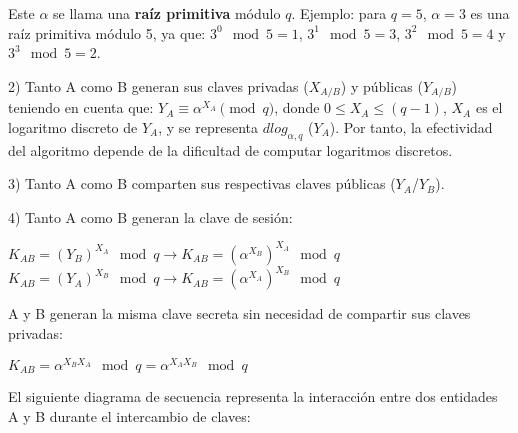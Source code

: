 \documentclass[11pt]{article}
\begin{document}
Este $\alpha$ se llama una \textbf{raíz primitiva} módulo $q$. Ejemplo: para $q = 5$, $\alpha = 3$ es una raíz primitiva módulo 5, ya que:
$3^0 \mod 5 = 1$, $3^1 \mod 5 = 3$, $3^2 \mod 5 = 4$ y $3^3 \mod 5 = 2$.

2) Tanto A como B generan sus claves privadas ($X_{A/B}$) y públicas ($Y_{A/B}$) teniendo en cuenta que:  $ Y_{A} \equiv \alpha^{X_A} \pmod{q}$, donde $0 \le X_A \le (q-1)$, $X_A$ es el logaritmo discreto de $Y_A$, y se representa $dlog_{\alpha,q}$ ($Y_A$). Por tanto, la efectividad del algoritmo depende de la dificultad de computar logaritmos discretos.

3) Tanto A como B comparten sus respectivas claves públicas ($Y_A$/$Y_B$).

4) Tanto A como B generan la clave de sesión: 
\begin{center}
$K_{AB} = (Y_B)^{X_A} \mod q \rightarrow K_{AB} = (\alpha^{X_B})^{X_A} \mod q$  \\
$K_{AB} = (Y_A)^{X_B} \mod q \rightarrow K_{AB} = (\alpha^{X_A})^{X_B} \mod q$  \\
\end{center}

A y B generan la misma clave secreta sin necesidad de compartir sus claves privadas:

\begin{center}
$K_{AB} = \alpha^{X_B X_A} \mod q = \alpha^{X_A X_B} \mod q$
\end{center}

El siguiente diagrama de secuencia representa la interacción entre dos entidades A y B durante el intercambio de claves:
\begin{center}\end{center}
\end{document}

